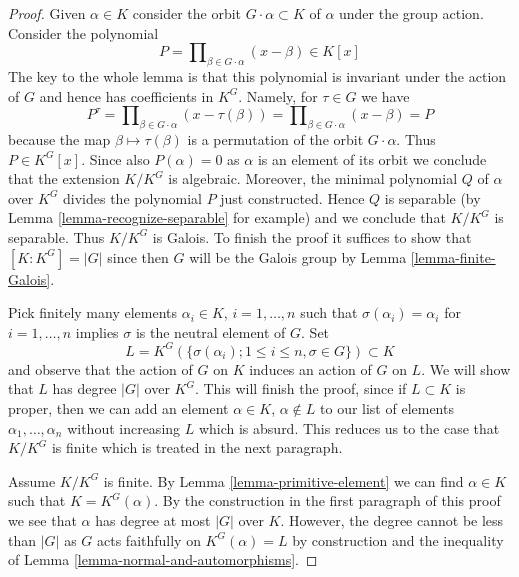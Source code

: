 \documentclass[10pt,a4paper]{amsart}
\theoremstyle{plain}
\theoremstyle{definition}
\theoremstyle{remark}
\numberwithin{equation}{subsection}
\begin{document}
\begin{proof}
Given $\alpha \in K$ consider the orbit $G \cdot \alpha \subset K$
of $\alpha$ under the group action. Consider the polynomial
$$
P = \prod\nolimits_{\beta \in G \cdot \alpha} (x - \beta) \in K[x]
$$
The key to the whole lemma is that this polynomial is invariant
under the action of $G$ and hence has coefficients in $K^G$.
Namely, for $\tau \in G$ we have
$$
P^\tau = \prod\nolimits_{\beta \in G \cdot \alpha} (x - \tau(\beta)) =
\prod\nolimits_{\beta \in G \cdot \alpha} (x - \beta) = P
$$
because the map $\beta \mapsto \tau(\beta)$ is a permutation of
the orbit $G \cdot \alpha$. Thus $P \in K^G[x]$. Since also
$P(\alpha) = 0$ as $\alpha$ is an element of its orbit
we conclude that the extension $K/K^G$ is algebraic. Moreover,
the minimal polynomial $Q$ of $\alpha$ over $K^G$ divides the
polynomial $P$ just constructed. Hence $Q$ is separable
(by Lemma \ref{lemma-recognize-separable} for example) and
we conclude that $K/K^G$ is separable. Thus $K/K^G$ is Galois.
To finish the proof it suffices to show that $[K : K^G] = |G|$
since then $G$ will be the Galois group by
Lemma \ref{lemma-finite-Galois}.

\medskip\noindent
Pick finitely many elements $\alpha_i \in K$, $i = 1, \ldots, n$
such that $\sigma(\alpha_i) = \alpha_i$ for $i = 1, \ldots, n$ implies
$\sigma$ is the neutral element of $G$. Set
$$
L = K^G(\{\sigma(\alpha_i); 1 \leq i \leq n, \sigma \in G\}) \subset K
$$
and observe that the action of $G$ on $K$ induces an action of $G$ on $L$.
We will show that $L$ has degree $|G|$ over $K^G$. This will finish the
proof, since if $L \subset K$ is proper, then we can add an element
$\alpha \in K$, $\alpha \not \in L$ to our list of elements
$\alpha_1, \ldots, \alpha_n$ without increasing $L$ which is absurd.
This reduces us to the case that $K/K^G$ is finite which is
treated in the next paragraph.

\medskip\noindent
Assume $K/K^G$ is finite. By Lemma \ref{lemma-primitive-element}
we can find $\alpha \in K$ such that $K = K^G(\alpha)$.
By the construction in the first paragraph of this proof we see
that $\alpha$ has degree at most $|G|$ over $K$. However, the
degree cannot be less than $|G|$ as $G$ acts faithfully on
$K^G(\alpha) = L$ by construction and the inequality of
Lemma \ref{lemma-normal-and-automorphisms}.
\end{proof}
\end{document}
